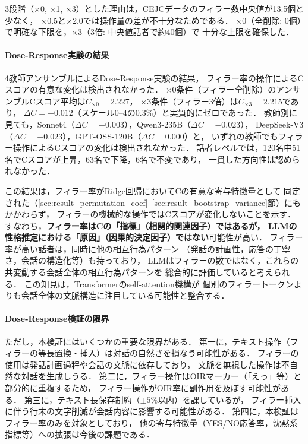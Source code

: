 \documentclass[dvipdfmx,11pt,a4paper]{bxjsarticle}
\begin{document}
3段階（×0, ×1, ×3）とした理由は，CEJCデータのフィラー数中央値が13.5個と少なく，
×0.5と×2.0では操作量の差が不十分なためである．
×0（全削除: 0個）で明確な下限を，×3（3倍: 中央値話者で約40個）で
十分な上限を確保した．

\paragraph{Dose-Response実験の結果}

4教師アンサンブルによるDose-Response実験の結果，
フィラー率の操作によるCスコアの有意な変化は検出されなかった．
×0条件（フィラー全削除）のアンサンブルCスコア平均は$\bar{C}_{{\times 0}} = 2.227$，
×3条件（フィラー3倍）は$\bar{C}_{{\times 3}} = 2.215$であり，
$\Delta C = -0.012$（スケール0--4の0.3\%）と実質的にゼロであった．
教師別に見ても，Sonnet4（$\Delta C = -0.003$），Qwen3-235B（$\Delta C = -0.023$），
DeepSeek-V3（$\Delta C = -0.023$），GPT-OSS-120B（$\Delta C = 0.000$）と，
いずれの教師でもフィラー操作によるCスコアの変化は検出されなかった．
話者レベルでは，120名中51名でCスコアが上昇，63名で下降，6名で不変であり，
一貫した方向性は認められなかった．

この結果は，フィラー率がRidge回帰においてCの有意な寄与特徴量として
同定された（\ref{sec:result_permutation_coef}--\ref{sec:result_bootstrap_variance}節）にもかかわらず，
フィラーの機械的な操作ではCスコアが変化しないことを示す．
すなわち，\textbf{フィラー率はCの「指標」（相関的関連因子）ではあるが，
LLMの性格推定における「原因」（因果的決定因子）ではない}可能性が高い．
フィラー率が高い話者は，同時に他の相互行為パターン
（発話の計画性，応答の丁寧さ，会話の構造化等）も持っており，
LLMはフィラーの数ではなく，これらの共変動する会話全体の相互行為パターンを
総合的に評価していると考えられる．
この知見は，Transformerのself-attention機構が
個別のフィラートークンよりも会話全体の文脈構造に注目している可能性と整合する．

\paragraph{Dose-Response検証の限界}
ただし，本検証にはいくつかの重要な限界がある．
第一に，テキスト操作（フィラーの等長置換・挿入）は対話の自然さを損なう可能性がある．
フィラーの使用は発話計画過程や会話の文脈に依存しており\cite{clark1996,watanabe2003}，
文脈を無視した操作は不自然な対話を生成しうる．
第二に，フィラー操作はOIRマーカー（「えっ」等）と部分的に重複するため，
フィラー操作がOIR率に副作用を及ぼす可能性がある．
第三に，テキスト長保存制約（$\pm 5\%$以内）を課しているが，
フィラー挿入に伴う行末の文字削減が会話内容に影響する可能性がある．
第四に，本検証はフィラー率のみを対象としており，
他の寄与特徴量（YES/NO応答率，沈黙系指標等）への拡張は今後の課題である．
\end{document}
